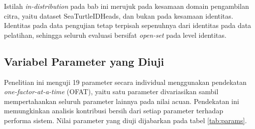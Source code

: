 Istilah \textit{in-distribution} pada bab ini merujuk pada kesamaan domain pengambilan citra, yaitu dataset SeaTurtleIDHeads, dan bukan pada kesamaan identitas. Identitas pada data pengujian tetap terpisah sepenuhnya dari identitas pada data pelatihan, sehingga seluruh evaluasi bersifat \textit{open-set} pada level identitas.

\subsection{Variabel Parameter yang Diuji}

Penelitian ini menguji 19 parameter secara individual menggunakan pendekatan \textit{one-factor-at-a-time} (OFAT), yaitu satu parameter divariasikan sambil mempertahankan seluruh parameter lainnya pada nilai acuan. Pendekatan ini memungkinkan analisis kontribusi bersih dari setiap parameter terhadap performa sistem. Nilai parameter yang diuji dijabarkan pada tabel \ref{tab:params}.

